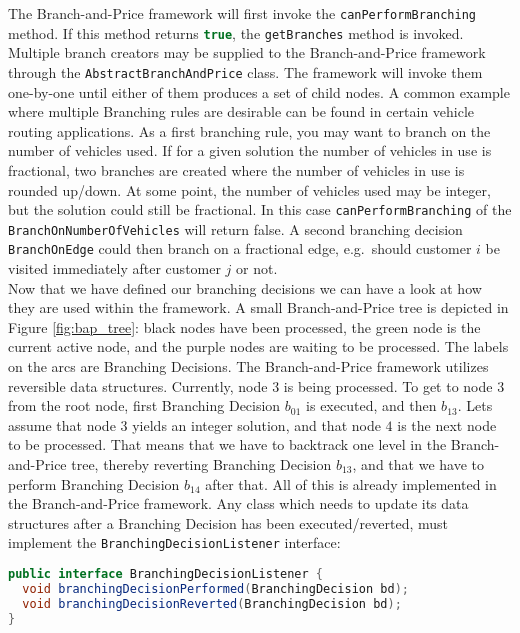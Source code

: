 \documentclass[a4paper]{article}
\newenvironment{myblock}[1]{%
    \tcolorbox[beamer,%
    noparskip,breakable,
    colback=lightBlueCodeBlock,colframe=darkBlueCodeBlock,%
    colbacklower=darkBlueCodeBlock!75!lightBlueCodeBlock,%
    coltitle=blueTitleCodeBlock,
    title=#1]}%
    {\endtcolorbox}
\newcommand{\code}[1]{\lstinline[language=java, style=seminar]!#1!}
\begin{document}
The Branch-and-Price framework will first invoke the \code{canPerformBranching} method. If this method returns \code{true}, the \code{getBranches} method is invoked. Multiple branch creators may be supplied to the Branch-and-Price framework through the \code{AbstractBranchAndPrice} class. The framework will invoke them one-by-one until either of them produces a set of child nodes. A common example where multiple Branching rules are desirable can be found in certain vehicle routing applications. As a first branching rule, you may want to branch on the number of vehicles used. If for a given solution the number of vehicles in use is fractional, two branches are created where the number of vehicles in use is rounded up/down. At some point, the number of vehicles used may be integer, but the solution could still be fractional. In this case \code{canPerformBranching} of the \code{BranchOnNumberOfVehicles} will return false. A second branching decision \code{BranchOnEdge} could then branch on a fractional edge, e.g.\ should customer $i$ be visited immediately after customer $j$ or not.\\
Now that we have defined our branching decisions we can have a look at how they are used within the framework. A small Branch-and-Price tree is depicted in Figure \ref{fig:bap_tree}: black nodes have been processed, the green node is the current active node, and the purple nodes are waiting to be processed. The labels on the arcs are Branching Decisions. The Branch-and-Price framework utilizes reversible data structures. Currently, node $3$ is being processed. To get to node $3$ from the root node, first Branching Decision $b_{01}$ is executed, and then $b_{13}$. Lets assume that node $3$ yields an integer solution, and that node $4$ is the next node to be processed. That means that we have to backtrack one level in the Branch-and-Price tree, thereby reverting Branching Decision $b_{13}$, and that we have to perform Branching Decision $b_{14}$ after that. All of this is already implemented in the Branch-and-Price framework. Any class which needs to update its data structures after a Branching Decision has been executed/reverted, must implement the \code{BranchingDecisionListener} interface:
\begin{myblock}{BranchingDecisionListener}
\begin{lstlisting}[language=java, style=eclipseArticle, xleftmargin=2em]  
public interface BranchingDecisionListener {
  void branchingDecisionPerformed(BranchingDecision bd);
  void branchingDecisionReverted(BranchingDecision bd);
}
\end{lstlisting}
\end{myblock}
\end{document}
